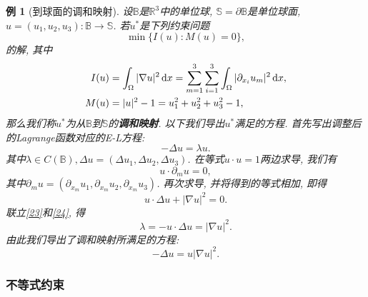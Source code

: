 \documentclass[12pt,a4paper]{article}
\newtheorem{example}[theorem]{例}
\begin{document}
\begin{example}[到球面的调和映射]
    设$\mathbb{B}$是$\mathbb{R}^3$中的单位球, $\mathbb{S} = \partial\mathbb{B}$是单位球面, $u =(u_1, u_2, u_3)\colon \mathbb{B} \rightarrow \mathbb{S}$.
    若$u^*$是下列约束问题
    \begin{equation*}
        \min\{I(u)\colon M(u) = 0\},
    \end{equation*}
    的解, 其中  
    \begin{align*}
        I(u) &= \int_{\Omega}|\nabla u|^2 \,{\rm d}x = \sum_{m = 1}^3\sum_{i = 1}^3\int_{\Omega}|\partial_{x_i}u_m|^2 \,{\rm d}x, \\  
        M(u) &= |u|^2 - 1 = u_1^2 + u_2^2 + u_3^2 - 1,
    \end{align*}
    那么我们称$u^*$为从$\mathbb{B}$到$\mathbb{S}$的\textbf{调和映射}. 以下我们导出$u^*$满足的方程.
    首先写出调整后的Lagrange函数对应的E-L方程:
    \begin{equation}\label{23}
        -\Delta u = \lambda u.
    \end{equation} 
    其中$\lambda \in C(\mathbb{B}), \Delta u = (\Delta u_1, \Delta u_2, \Delta u_3)$.
    在等式$u \cdot u = 1$两边求导, 我们有
    \begin{equation*}
        u \cdot \partial_m u = 0,
    \end{equation*}
    其中$\partial_mu = (\partial_{x_m}u_1, \partial_{x_m}u_2, \partial_{x_m}u_3)$.
    再次求导, 并将得到的等式相加, 即得
    \begin{equation}\label{24}
        u \cdot \Delta u +|\nabla u|^2 =0.
    \end{equation}
    联立\eqref{23}和\eqref{24}, 得 
    \begin{equation*}
        \lambda = -u \cdot \Delta u = |\nabla u|^2.
    \end{equation*}
    由此我们导出了调和映射所满足的方程:
    \begin{equation*}
        -\Delta u = u|\nabla u|^2.
    \end{equation*}
\end{example}

\subsubsection{不等式约束}
\end{document}
